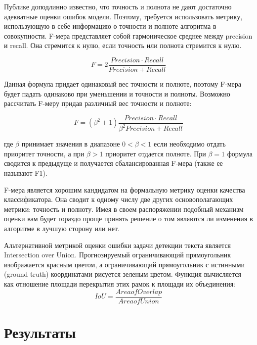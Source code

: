 \documentclass[12pt,twoside]{article}
\begin{document}
Публике доподлинно известно, что точность и полнота не дают достаточно адекватные оценки ошибок модели. Поэтому, требуется использовать метрику, использующую в себе информацию о точности и полноте алгоритма в совокупности. F-мера представляет собой гармоническое среднее между precision и recall. Она стремится к нулю, если точность или полнота стремится к нулю.

$$ F=2\frac{Precision \cdot Recall}{Precision + Recall} $$

Данная формула придает одинаковый вес точности и полноте, поэтому F-мера будет падать одинаково при уменьшении и точности и полноты. Возможно рассчитать F-меру придав различный вес точности и полноте:

$$ F=(\beta^2+1)\frac{Precision \cdot Recall}{\beta^2 Precision + Recall} $$

где $\beta$ принимает значения в диапазоне $0<\beta<1$ если необходимо отдать приоритет точности, а при $\beta>1$ приоритет отдается полноте. При $\beta=1$ формула сводится к предыдуще и получается сбалансированная F-мера (также ее называют F1).

F-мера является хорошим кандидатом на формальную метрику оценки качества классификатора. Она сводит к одному числу две других основополагающих метрики: точность и полноту. Имея в своем распоряжении подобный механизм оценки вам будет гораздо проще принять решение о том являются ли изменения в алгоритме в лучшую сторону или нет.

Альтернативной метрикой оценки ошибки задачи детекции текста является Intersection over Union. Прогнозируемый ограничивающий прямоугольник изображается красным цветом, а ограничивающий прямоугольник с истинными (ground truth) координатами рисуется зеленым цветом. Функция вычисляется как отношение площади перекрытия этих рамок к площади их объединения:
$$ IoU = \frac{Area of Overlap}{ Area of Union} $$

\section{Результаты}
\end{document}
